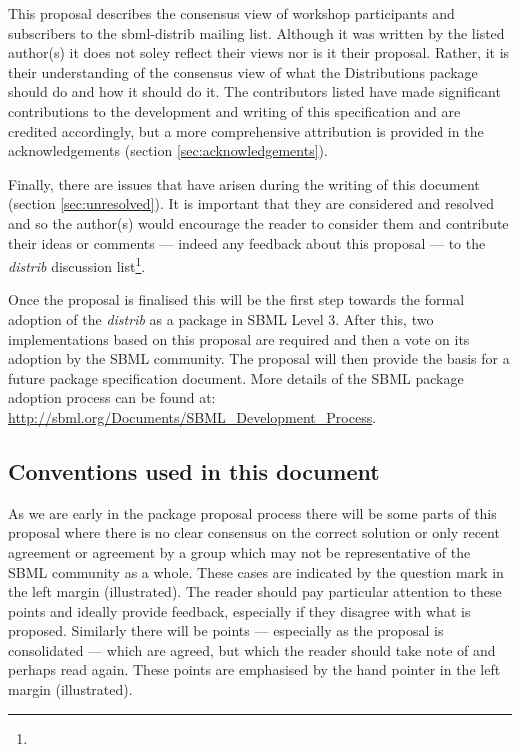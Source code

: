 \documentclass[draftspec]{sbmlpkgspec}
\newcommand{\distribshort}{\emph{distrib}\xspace}
\newcommand{\distrib}{Distributions\xspace}
\newcommand{\watchout}{\marginpar{\hspace*{34pt}\raisebox{-0.5ex}{\Large\ding{43}}}}
\newcommand{\controversial}{\marginpar{\hspace*{34pt}\raisebox{-0.5ex}{\Large?}}}
\begin{document}
This proposal describes the consensus view of workshop participants
and subscribers to the sbml-distrib mailing list. Although it was
written by the listed author(s) it does not soley reflect their views nor is
it their proposal. Rather, it is their understanding of the consensus
view of what the \distrib package should do and how it should do
it. The contributors listed have made significant contributions to the
development and writing of this specification and are credited
accordingly, but a more comprehensive attribution is provided in the
acknowledgements (section \ref{sec:acknowledgements}).

Finally, there are issues that have arisen during the writing of this
document (section \ref{sec:unresolved}). It is important that they are
considered and resolved and so the author(s) would encourage the
reader to consider them and contribute their ideas or comments ---
indeed any feedback about this proposal --- to the \distribshort
discussion list\footnote{}.

Once the proposal is finalised this will be the first step towards the
formal adoption of the \distribshort as a package in SBML Level
3. After this, two implementations based on this proposal are required
and then a vote on its adoption by the SBML community. The proposal
will then provide the basis for a future package specification
document. More details of the SBML package adoption process can be
found at: \url{http://sbml.org/Documents/SBML_Development_Process}.


\subsection{Conventions used in this document}

As we are early in the package proposal process there will be some
parts of this proposal where there is no clear consensus on the
correct solution or only recent agreement or agreement by a group
which may not be representative of the SBML community as a
whole. These cases are indicated by the \controversial question mark
in the left margin (illustrated). The reader should pay particular
attention to these points and ideally provide feedback, especially if
they disagree with what is proposed. Similarly there will be points
--- especially as the proposal is consolidated --- which are agreed,
but which the reader should take note of and perhaps read again. These
points \watchout are emphasised by the hand pointer in the left margin
(illustrated).
\end{document}
